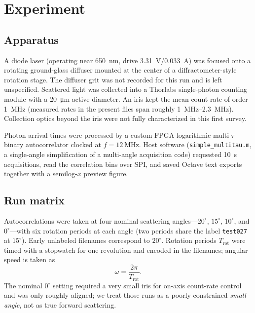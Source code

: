 \documentclass[11pt,letterpaper]{article}
\begin{document}
\section{Experiment}
\label{sec:experiment}

\subsection{Apparatus}

A diode laser (operating near \SI{650}{\nano\meter}, drive
\SI{3.31}{\volt}/\SI{0.033}{\ampere}) was focused onto a rotating ground-glass
diffuser mounted at the center of a diffractometer-style rotation stage. The
diffuser grit was not recorded for this run and is left unspecified. Scattered
light was collected into a Thorlabs single-photon counting module with a
\SI{20}{\micro\meter} active diameter. An iris kept the mean count rate of order
\SI{1}{\mega\hertz} (measured rates in the present files span roughly
\SIrange{1}{2.3}{\mega\hertz}). Collection optics beyond the iris were not fully
characterized in this first survey.

Photon arrival times were processed by a custom FPGA logarithmic multi-$\tau$
binary autocorrelator clocked at $f=\SI{12}{\mega\hertz}$. Host software
(\texttt{simple\_multitau.m}, a single-angle simplification of a multi-angle
acquisition code) requested \SI{10}{\second} acquisitions, read the correlation
bins over SPI, and saved Octave text exports together with a semilog-$x$
preview figure.

\subsection{Run matrix}

Autocorrelations were taken at four nominal scattering angles---$20^\circ$,
$15^\circ$, $10^\circ$, and $0^\circ$---with six rotation periods at each angle
(two periods share the label \texttt{test027} at $15^\circ$). Early unlabeled
filenames correspond to $20^\circ$. Rotation periods $T_{\mathrm{rot}}$ were timed
with a stopwatch for one revolution and encoded in the filenames; angular speed
is taken as
\begin{equation}
  \omega = \frac{2\pi}{T_{\mathrm{rot}}}.
\end{equation}
The nominal $0^\circ$ setting required a very small iris for on-axis count-rate
control and was only roughly aligned; we treat those runs as a poorly
constrained \emph{small angle}, not as true forward scattering.
\end{document}
